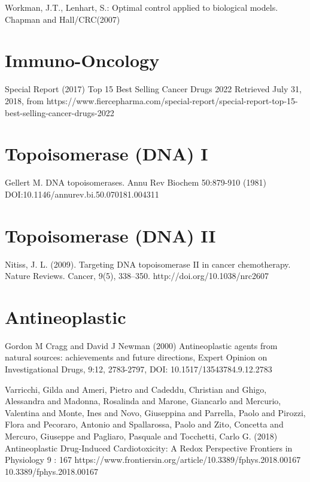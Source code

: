 \begin{thebibliography}{00}
Workman,  J.T.,  Lenhart,  S.:  
\newblock Optimal  control  applied  to  biological  models.  
\newblock Chapman  and  Hall/CRC(2007)


\section{Immuno-Oncology}

Special Report (2017)
\newblock Top 15 Best Selling Cancer Drugs 2022
\newblock Retrieved July 31, 2018, from https://www.fiercepharma.com/special-report/special-report-top-15-best-selling-cancer-drugs-2022

\section{Topoisomerase (DNA) I}

Gellert M.
\newblock DNA topoisomerases.
\newblock Annu Rev Biochem 50:879-910 (1981) DOI:10.1146/annurev.bi.50.070181.004311

\section{Topoisomerase (DNA) II}

Nitiss, J. L. (2009). 
\newblock Targeting DNA topoisomerase II in cancer chemotherapy. Nature Reviews. 
\newblock Cancer, 9(5), 338–350. http://doi.org/10.1038/nrc2607


\section{Antineoplastic}

Gordon M Cragg and David J Newman (2000) 
\newblock Antineoplastic agents from natural sources: achievements and future directions, 
\newblock Expert Opinion on Investigational Drugs, 9:12, 2783-2797, DOI: 10.1517/13543784.9.12.2783

Varricchi, Gilda and Ameri, Pietro and Cadeddu, Christian and Ghigo, Alessandra and Madonna, Rosalinda and Marone, Giancarlo and Mercurio, Valentina and Monte, Ines and Novo, Giuseppina and Parrella, Paolo and Pirozzi, Flora and Pecoraro, Antonio and Spallarossa, Paolo and Zito, Concetta and Mercuro, Giuseppe and Pagliaro, Pasquale and Tocchetti, Carlo G. (2018)  
\newblock Antineoplastic Drug-Induced Cardiotoxicity: A Redox Perspective 
\newblock Frontiers in Physiology 9 : 167  https://www.frontiersin.org/article/10.3389/fphys.2018.00167 10.3389/fphys.2018.00167


\end{thebibliography}
